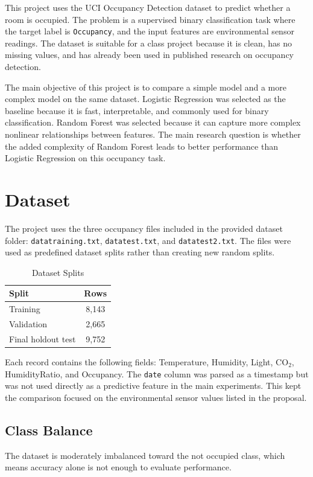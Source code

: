 \documentclass[12pt]{article}
\begin{document}
This project uses the UCI Occupancy Detection dataset to predict whether a room is occupied. The problem is a supervised binary classification task where the target label is \texttt{Occupancy}, and the input features are environmental sensor readings. The dataset is suitable for a class project because it is clean, has no missing values, and has already been used in published research on occupancy detection.

The main objective of this project is to compare a simple model and a more complex model on the same dataset. Logistic Regression was selected as the baseline because it is fast, interpretable, and commonly used for binary classification. Random Forest was selected because it can capture more complex nonlinear relationships between features. The main research question is whether the added complexity of Random Forest leads to better performance than Logistic Regression on this occupancy task.

\section{Dataset}
The project uses the three occupancy files included in the provided dataset folder: \texttt{datatraining.txt}, \texttt{datatest.txt}, and \texttt{datatest2.txt}. The files were used as predefined dataset splits rather than creating new random splits.

\begin{table}[H]
\centering
\caption{Dataset Splits}
\begin{tabular}{lc}
\toprule
Split & Rows \\
\midrule
Training & 8,143 \\
Validation & 2,665 \\
Final holdout test & 9,752 \\
\bottomrule
\end{tabular}
\end{table}

Each record contains the following fields: Temperature, Humidity, Light, CO$_2$, HumidityRatio, and Occupancy. The \texttt{date} column was parsed as a timestamp but was not used directly as a predictive feature in the main experiments. This kept the comparison focused on the environmental sensor values listed in the proposal.

\subsection{Class Balance}
The dataset is moderately imbalanced toward the not occupied class, which means accuracy alone is not enough to evaluate performance.
\end{document}

